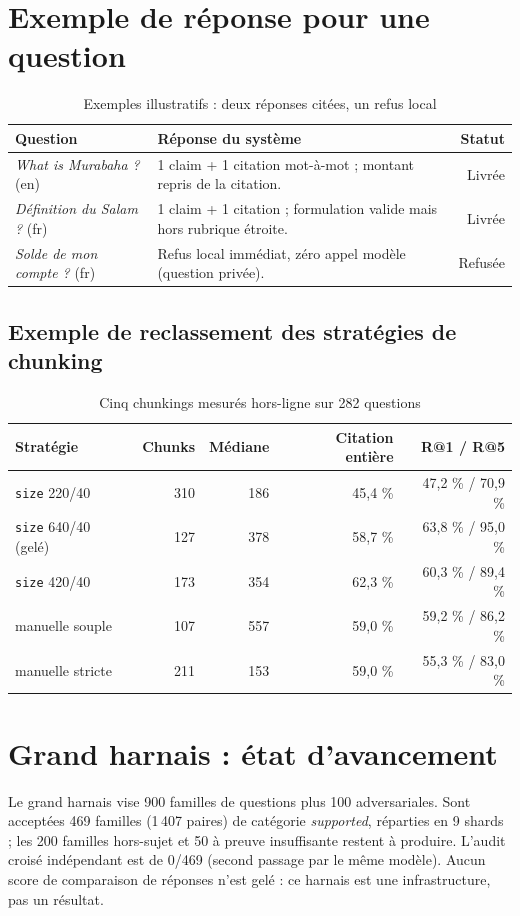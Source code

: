 \documentclass[a4paper,12pt]{report}
\begin{document}
\section{Exemple de r\'eponse pour une question}
\begin{table}[H]
\centering
\begin{tabular}{|p{3.2cm}|p{6.5cm}|r|}
\hline
Question & R\'eponse du syst\`eme & Statut \\
\hline
\textit{What is Murabaha ?} (en) & 1 claim + 1 citation mot-\`a-mot ; montant repris de la citation. & Livr\'ee \\
\hline
\textit{D\'efinition du Salam ?} (fr) & 1 claim + 1 citation ; formulation valide mais hors rubrique \'etroite. & Livr\'ee \\
\hline
\textit{Solde de mon compte ?} (fr) & Refus local imm\'ediat, z\'ero appel mod\`ele (question priv\'ee). & Refus\'ee \\
\hline
\end{tabular}
\caption{Exemples illustratifs : deux r\'eponses cit\'ees, un refus local}
\end{table}

\subsection{Exemple de reclassement des strat\'egies de chunking}
\begin{table}[H]
\centering
\begin{tabular}{|l|r|r|r|r|}
\hline
Strat\'egie & Chunks & M\'ediane & Citation enti\`ere & R@1 / R@5 \\
\hline
\texttt{size} 220/40 & 310 & 186 & 45,4 \% & 47,2 \% / 70,9 \% \\
\hline
\texttt{size} 640/40 (gel\'e) & 127 & 378 & 58,7 \% & 63,8 \% / 95,0 \% \\
\hline
\texttt{size} 420/40 & 173 & 354 & 62,3 \% & 60,3 \% / 89,4 \% \\
\hline
manuelle souple & 107 & 557 & 59,0 \% & 59,2 \% / 86,2 \% \\
\hline
manuelle stricte & 211 & 153 & 59,0 \% & 55,3 \% / 83,0 \% \\
\hline
\end{tabular}
\caption{Cinq chunkings mesur\'es hors-ligne sur 282 questions}
\end{table}

\section{Grand harnais : \'etat d'avancement}
Le grand harnais vise 900 familles de questions plus 100 adversariales. Sont accept\'ees 469 familles (1\,407 paires) de cat\'egorie \textit{supported}, r\'eparties en 9 shards ; les 200 familles hors-sujet et 50 \`a preuve insuffisante restent \`a produire. L'audit crois\'e ind\'ependant est de 0/469 (second passage par le m\^eme mod\`ele). Aucun score de comparaison de r\'eponses n'est gel\'e : ce harnais est une infrastructure, pas un r\'esultat.
\end{document}
